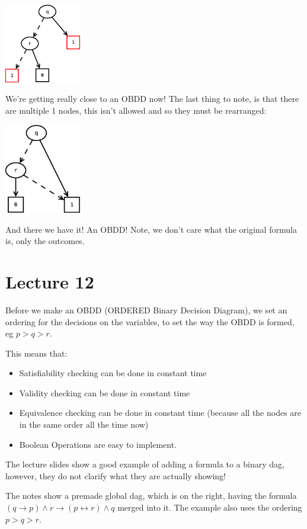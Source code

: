 \documentclass[11pt,a4paper]{article}
\begin{document}
\centerline{\includegraphics[width=0.25\textwidth]{OBDDForming2.eps}}

We're getting really close to an OBDD now! The last thing to note, is that there are multiple 1 nodes, this isn't allowed and so they must be rearranged:

\centerline{\includegraphics[width=0.25\textwidth]{OBDDForming3.eps}}

And there we have it! An OBDD! Note, we don't care what the original formula is, only the outcomes.

\section{Lecture 12}

Before we make an OBDD (ORDERED Binary Decision Diagram), we set an ordering for the decisions on the variables, to set the way the OBDD is formed, eg $p > q > r$.

This means that:
\begin{itemize}
\item Satisfiability checking can be done in constant time
\item Validity checking can be done in constant time
\item Equivalence checking can be done in constant time (because all the nodes are in the same order all the time now)
\item Boolean Operations are easy to implement.
\end{itemize}

The lecture slides show a good example of adding a formula to a binary dag, however, they do not clarify what they are actually showing!

The notes show a premade global dag, which is on the right, having the formula $(q \rightarrow p) \wedge r \rightarrow (p \leftrightarrow r) \wedge q$ merged into it. The example also uses the ordering $p > q > r$.
\end{document}
